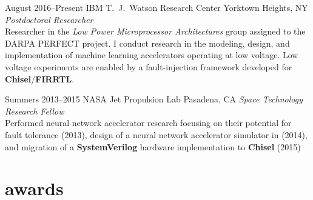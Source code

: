 \documentclass[print]{friggeri-cv} %
\begin{document}
\begin{entrylist}


\entry
{August 2016--Present}
{IBM T.\ J.\ Watson Research Center}
{Yorktown Heights, NY}
{\emph{Postdoctoral Researcher}\\
Researcher in the \emph{Low Power Microprocessor Architectures} group assigned to the DARPA PERFECT project. I conduct research in the modeling, design, and implementation of machine learning accelerators operating at low voltage. Low voltage experiments are enabled by a fault-injection framework developed for \textbf{Chisel}/\textbf{FIRRTL}.
}

\entry
{Summers 2013--2015}
{NASA Jet Propulsion Lab}
{Pasadena, CA}
{\emph{Space Technology Research Fellow}\\
  Performed neural network accelerator research focusing on their potential for fault tolerance (2013), design of a neural network accelerator simulator in \textbf{\CPP} (2014), and migration of a \textbf{SystemVerilog} hardware implementation to \textbf{Chisel} (2015)}



\end{entrylist}

\clearpage
{}

\section{awards}
\end{document}
